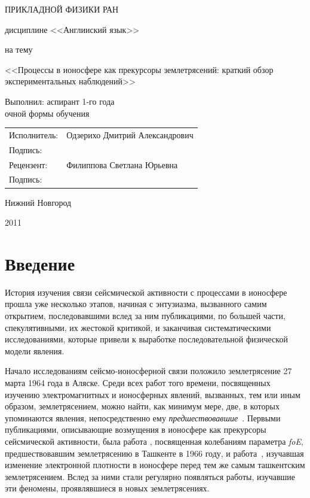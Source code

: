 \documentclass[12pt, oneside, a4paper]{article}
\begin{document}
\begin{titlepage}
\centerline{\large{} ПРИКЛАДНОЙ ФИЗИКИ РАН}
\vspace{3.0cm}
\centerline{\large{}}
\vspace{0.2cm}
\centerline{ дисциплине <<Англииский язык>>}
\vspace{0.3cm}
\centerline{на тему}
\vspace{0.2cm}
\begin{center}
\large
<<Процессы в ионосфере как прекурсоры землетрясений: краткий обзор экспериментальных наблюдений>>
\vspace{1.0cm}
\begin{flushright}
\normalsize
Выполнил: аспирант 1-го года\\очной формы обучения 
\end{flushright}
\normalsize
\begin{flushright}
\begin{tabular}{>{\flushright}p{3.0cm}>{\flushleft}p{7.0cm}}
Исполнитель: & Одзерихо Дмитрий Александрович\tabularnewline
Подпись: &\tabularnewline
Рецензент: & Филиппова Светлана Юрьевна \tabularnewline
Подпись: &\tabularnewline
\end{tabular}
\end{flushright}
\vfill
\vspace{0.7cm}
\centerline{Нижний Новгород}
\centerline{2011}
\end{center}
\end{titlepage}
\tableofcontents
\newpage
\section{Введение}
История изучения связи сейсмической активности с процессами в ионосфере прошла уже несколько этапов, начиная с энтузиазма, вызванного самим открытием, последовавшими вслед за ним публикациями, по большей части, спекулятивными, их жестокой критикой, и заканчивая систематическими исследованиями, которые привели к выработке  последовательной физической модели явления. 

Начало исследованиям сейсмо-ионосферной связи положило землетрясение 27 марта 1964 года в Аляске. Среди всех работ того времени, посвященных изучению электромагнитных и ионосферных явлений, вызванных, тем или иным образом, землетрясением, можно найти, как минимум мере, две, в которых упоминаются явления, непосредственно ему \emph{предшествовавшие}~\cite{Moore:1964,Davies_Baker:1965}. Первыми публикациями, описывающие возмущения в ионосфере как прекурсоры сейсмической активности, была работа \cite{Antselevich:1971}, посвященная колебаниям параметра \emph{foE}, предшествовавшим землетрясению в Ташкенте в 1966 году, и работа~\cite{Datchenko:1972}, изучавшая изменение электронной плотности в ионосфере перед тем же самым ташкентским землетрясением. Вслед за ними стали регулярно появляться работы, изучавшие эти феномены, проявлявшиеся в новых землетрясениях. 
\end{document}
